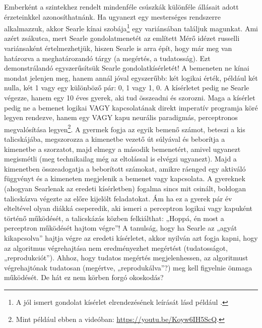 \documentclass[a4paper]{article}
\begin{document}
Emberként a szintekhez rendelt mindenféle csúszkák különféle állásait adott érzeteinkkel azonosíthatnánk. Ha ugyanezt egy mesterséges rendszerre alkalmazzuk, akkor Searle kínai szobája\footnote{A jól ismert gondolat kísérlet elrendezésének leírását lásd például \cite[33]{Penrose93}.} egy variánsában találjuk magunkat. Ami azért zsákutca, mert Searle gondolatmenetét az említett Mérő idézet russelli variánsaként értelmezhetjük, hiszen Searle is arra épít, hogy már meg van határozva a meghatározandó tárgy (a megértés, a tudatosság). Ezt de\-monst\-rál\-an\-dó egyszerűsítsük Searle gondolatkísérletét! A bemeneten ne kínai mondat jelenjen meg, hanem annál jóval egyszerűbb: két logikai érték, például két nulla, két 1 vagy egy különböző pár: 0, 1 vagy 1, 0. A kísérletet pedig ne Searle végezze, hanem egy 10 éves gyerek, aki tud összeadni és szorozni. Maga a kísérlet pedig ne a bemenet logikai VAGY kapcsolatának direkt imperatív programja köré legyen rendezve, hanem egy VAGY kapu neurális paradigmás, perceptronos megvalósítása legyen\footnote{Mint például ebben a videóban: \url{https://youtu.be/Koyw6IH5ScQ}.}. A gyermek fogja az egyik bemenő számot, beteszi a kis talicskájába, megszorozza a kimenetbe vezető út súlyával és beborítja a kimenetbe a szorzatot, majd elmegy a második bemenetért, amivel ugyanezt megismétli (meg technikailag még az eltolással is elvégzi ugyanezt). Majd a kimenetben összeadogatja a beborított számokat, amikre ráenged egy aktiváló függvényt és a kimeneten megjelenik a bemenet vagy kapcsolata. A gyereknek (ahogyan Searlenak az eredeti kísérletben) fogalma sincs mit csinált, boldogan talicskázva végezte az előre kijelölt feladatokat. Ám ha ez a gyerek pár év elteltével olyan diákká cseperedik, aki ismeri a perceptron logikai vagy kapuként történő működését, a talicskázás közben felkiálthat: „Hoppá, én most a perceptron működését hajtom végre”! A tanulság, hogy ha Searle az „agyát kikapcsolva” hajtja végre az eredeti kísérletet, akkor nyilván azt fogja kapni, hogy az algoritmus végrehajtása nem eredményezhet megértést (tudatosságot, „reprodukciót”). Ahhoz, hogy tudatos megértés megjelenhessen, az algoritmust végrehajtónak tudatosan (megértve, „reprodukálva”?) meg kell figyelnie önmaga működését. De hát ez nem körben forgó okoskodás?
\end{document}
